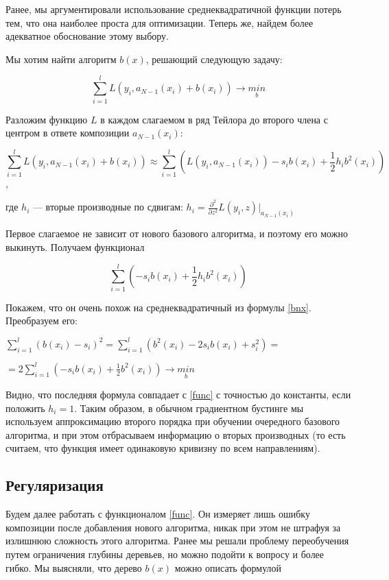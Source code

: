 \documentclass{article}
\theoremstyle{definition}
\theoremstyle{theorem}
\theoremstyle{remark}
\theoremstyle{theorem}
\theoremstyle{example}
\theoremstyle{theorem}
\theoremstyle{theorem}
\theoremstyle{theorem}
\theoremstyle{theorem}
\begin{document}
Ранее, мы аргументировали использование среднеквадратичной функции потерь тем, что она наиболее проста для оптимизации. Теперь же, найдем более адекватное обоснование этому выбору.

Мы хотим найти алгоритм $b(x)$, решающий следующую задачу:

$$\sum\limits_{i=1}^{l} L \left(y_i, a_{N-1}(x_i) + b(x_i)\right) \rightarrow \underset{b}{min}$$

Разложим функцию $L$ в каждом слагаемом в ряд Тейлора до второго члена с центром
в ответе композиции $a_{N-1}(x_i)$:

$$\sum\limits_{i=1}^{l} L \left(y_i, a_{N-1}(x_i) + b(x_i)\right) \approx \sum\limits_{i=1}^{l}\left( L \left(y_i, a_{N-1}(x_i)\right) - s_i b(x_i) + \frac{1}{2} h_i b^2(x_i)\right)$$,

где  $h_i$ --- вторые производные по сдвигам: $h_i = \frac{\partial ^2}{\partial z^2} L(y_i,z)|_{a_{N-1}(x_i)}$

Первое слагаемое не зависит от нового базового алгоритма, и поэтому его можно
выкинуть. Получаем функционал

\begin{equation}\label{func}
	\sum\limits_{i=1}^{l}\left(  - s_i b(x_i) + \frac{1}{2} h_i b^2(x_i)\right)
\end{equation}


Покажем, что он очень похож на среднеквадратичный из формулы \ref{bnx}. Преобразуем его:

$\sum\limits_{i=1}^{l} (b(x_i) - s_i)^2 = \sum\limits_{i=1}^{l} (b^2(x_i) - 2s_i b(x_i) + s_i^2) =$

$ = 2\sum\limits_{i=1}^{l} (-s_i b(x_i) + \frac{1}{2} b^2(x_i)) \rightarrow \underset{b}{min}$


Видно, что последняя формула совпадает с \ref{func} с точностью до константы, если положить $h_i=1$. Таким образом, в обычном градиентном бустинге мы используем аппроксимацию второго порядка при обучении очередного базового алгоритма, и при этом отбрасываем информацию о вторых производных (то есть считаем, что функция имеет одинаковую кривизну по всем направлениям).

\subsection{Регуляризация}

Будем далее работать с функционалом \ref{func}. Он измеряет лишь ошибку композиции после добавления нового алгоритма, никак при этом не штрафуя за излишнюю
сложность этого алгоритма. Ранее мы решали проблему переобучения путем ограничения глубины деревьев, но можно подойти к вопросу и более гибко. Мы выясняли,
что дерево $b(x)$ можно описать формулой
\end{document}
